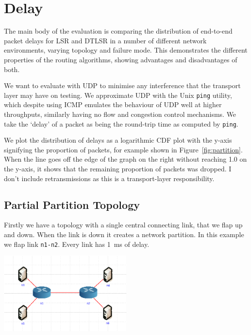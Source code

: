 \documentclass[withindex,glossary,openany]{cam-thesis}
\begin{document}
\section{Delay}

The main body of the evaluation is comparing the distribution of end-to-end packet delays for LSR and DTLSR in a number of different network environments, varying topology and failure mode. This demonstrates the different properties of the routing algorithms, showing advantages and disadvantages of both.

We want to evaluate with UDP to minimise any interference that the transport layer may have on testing. We approximate UDP with the Unix \texttt{ping} utility, which despite using ICMP emulates the behaviour of UDP well at higher throughputs, similarly having no flow and congestion control mechanisms. We take the `delay' of a packet as being the round-trip time as computed by \texttt{ping}.

We plot the distribution of delays as a logarithmic CDF plot with the y-axis signifying the proportion of packets, for example shown in Figure~\ref{fig:partition}. When the line goes off the edge of the graph on the right without reaching 1.0 on the y-axis, it shows that the remaining proportion of packets was dropped. I don't include retransmissions as this is a transport-layer responsibility.

\subsection{Partial Partition Topology}

Firstly we have a topology with a single central connecting link, that we flap up and down. When the link is down it creates a network partition. In this example we flap link \texttt{n1-n2}. Every link has \SI{1}{\ms} of delay.

\begin{minipage}{1\textwidth} \centering
	\includegraphics[width=0.5\textwidth]{delay_partition_topology}
	\label{fig:partition_topology}
\end{minipage}
\end{document}
